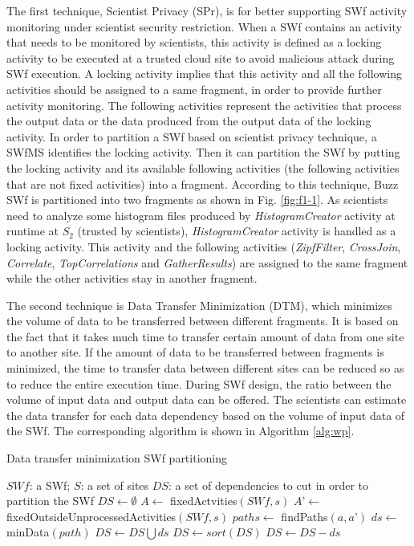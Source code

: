 The first technique, Scientist Privacy (SPr), is for better supporting SWf activity monitoring under scientist security restriction. 
When a SWf contains an activity that needs to be monitored by scientists, this activity is defined as a locking activity to be executed at a trusted cloud site to avoid malicious attack during SWf execution. 
A locking activity implies that this activity and all the following activities should be assigned to a same fragment, 
in order to provide further activity monitoring. 
The following activities represent the activities that process the output data or the data produced from the output data of the locking activity.
In order to partition a SWf based on scientist privacy technique, 
a SWfMS identifies the locking activity. 
Then it can partition the SWf by putting the locking activity and its available following activities (the following activities that are not fixed activities) into a fragment. 
According to this technique, Buzz SWf is partitioned into two fragments as shown in Fig. \ref{fig:f1-1}. 
As scientists need to analyze some histogram files produced by \textit{HistogramCreator} activity at runtime at \textit{$S_{2}$} (trusted by scientists),  
\textit{HistogramCreator} activity is handled as a locking activity.
This activity and the following activities (\textit{ZipfFilter}, \textit{CrossJoin}, \textit{Correlate}, \textit{TopCorrelations} and \textit{GatherResults}) are assigned to the same fragment while the other activities stay in another fragment.

The second technique is Data Transfer Minimization (DTM), which minimizes the volume of data to be transferred between different fragments. It is based on the fact that it takes much time to transfer certain amount of data from one site to another site. If the amount of data to be transferred between fragments is minimized, the time to transfer data between different sites can be reduced so as to reduce the entire execution time. During SWf design, the ratio between the volume of input data and output data can be offered. The scientists can estimate the data transfer for each data dependency based on the volume of input data of the SWf. The corresponding algorithm is shown in Algorithm \ref{alg:wp}.

\linespread{1.0}
\begin{algorithm}[ht]
\caption{Data transfer minimization SWf partitioning}\label{alg:wp}
\begin{algorithmic}[1]
\INPUT $SWf$: a SWf;
$S$: a set of sites
\OUTPUT $DS$: a set of dependencies to cut in order to partition the SWf
\BEGIN
\State $DS\gets \emptyset$
\State $A\gets$ fixedActvities$( SWf, s )$
\State $A’\gets$ fixedOutsideUnprocessedActivities$( SWf, s )$
\State $paths\gets$ findPaths$( a, a’ )$
\State $ds\gets$ minData$(path)$
\State $DS\gets DS \bigcup ds$
\EndFor
\EndFor
\EndFor
\EndFor
\State $DS\gets sort(DS)$ 
\State $DS\gets DS - ds $
\EndIf
\EndFor
\ENDBEGIN
\end{algorithmic}
\end{algorithm}


